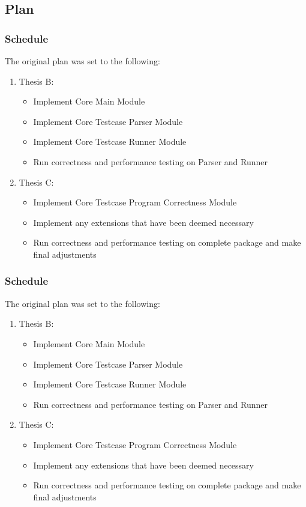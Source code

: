 \documentclass[xcolor]{beamer}
\begin{document}
\subsection{Plan}
\begin{frame}
	\frametitle{Schedule}
	The original plan was set to the following:
	\begin{enumerate}
	\item Thesis B:
	\begin{itemize}
		\item Implement Core Main Module
			\pause
		\item Implement Core Testcase Parser Module
			\pause
		\item Implement Core Testcase Runner Module
			\pause
		\item Run correctness and performance testing on Parser and Runner
			\pause
	\end{itemize}
	\item Thesis C:
	\begin{itemize}
		\item Implement Core Testcase Program Correctness Module
			\pause
		\item Implement any extensions that have been deemed necessary
			\pause
		\item Run correctness and performance testing on complete package and make final adjustments
	\end{itemize}
	\end{enumerate}
\end{frame}

\begin{frame}
	\frametitle{Schedule}
	The original plan was set to the following:
	\begin{enumerate}
		\item Thesis B:
		\begin{itemize}
			\item Implement Core Main Module
			\pause
			\item Implement Core Testcase Parser Module
			\pause
			\item Implement Core Testcase Runner Module
			\pause
			\item Run correctness and performance testing on Parser and Runner
			\pause
		\end{itemize}
		\item Thesis C:
		\begin{itemize}
			\item Implement Core Testcase Program Correctness Module
			\pause
			\item Implement any extensions that have been deemed necessary
			\pause
			\item Run correctness and performance testing on complete package and make final adjustments
		\end{itemize}
	\end{enumerate}
\end{frame}
\end{document}
